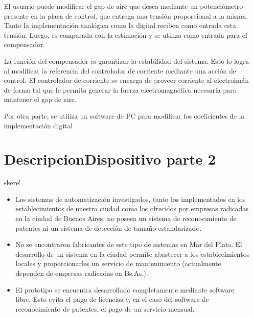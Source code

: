 El usuario puede modificar el gap de aire que desea mediante un potenciómetro presente en la placa de control, que entrega una tensión proporcional a la misma. Tanto la implementación analógica como la digital reciben como entrada esta tensión. Luego, es comparada con la estimación y se utiliza como entrada para el compensador.

La función del compensador es garantizar la estabilidad del sistema. Esto lo logra al modificar la referencia del controlador de corriente mediante una acción de control. El controlador de corriente se encarga de proveer corriente al electroimán de forma tal que le permita generar la fuerza electromagnética necesaria para mantener el gap de aire. 

Por otra parte, se utiliza un software de PC para modificar los coeficientes de la implementación digital.


\section{DescripcionDispositivo parte 2}

skere!

\begin{itemize}
	\item Los sistemas de automatización investigados, tanto los implementados en los establecimientos de nuestra ciudad como los ofrecidos por empresas radicadas en la ciudad de Buenos Aires, no poseen un sistema de reconocimiento de patentes ni un sistema de detección de tamaño estandarizado.
	\item No se encontraron fabricantes de este tipo de sistemas en Mar del Plata. El desarrollo de un sistema en la ciudad permite abastecer a los establecimientos locales y proporcionarles un servicio de mantenimiento (actualmente dependen de empresas radicadas en Bs.As.).
	\item El prototipo se encuentra desarrollado completamente mediante software libre. Esto evita el pago de licencias y, en el caso del software de reconocimiento de patentes, el pago de un servicio mensual.
\end{itemize}





